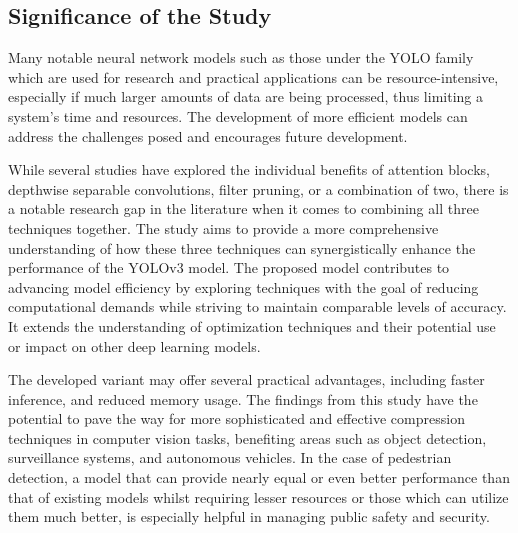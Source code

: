 \subsection{Significance of the Study}

Many notable neural network models such as those under the YOLO family which are used for research and practical applications can be resource-intensive, especially if much larger amounts of data are being processed, thus limiting a system's time and resources. The development of more efficient models can address the challenges posed and encourages future development. 

While several studies have explored the individual benefits of attention blocks, depthwise separable convolutions, filter pruning, or a combination of two, there is a notable research gap in the literature when it comes to combining all three techniques together. The study aims to provide a more comprehensive understanding of how these three techniques can synergistically enhance the performance of the YOLOv3 model. The proposed model contributes to advancing model efficiency by exploring techniques with the goal of reducing computational demands while striving to maintain comparable levels of accuracy. It extends the understanding of optimization techniques and their potential use or impact on other deep learning models.

The developed variant may offer several practical advantages, including faster inference, and reduced memory usage. The findings from this study have the potential to pave the way for more sophisticated and effective compression techniques in computer vision tasks, benefiting areas such as object detection, surveillance systems, and autonomous vehicles. In the case of pedestrian detection, a model that can provide nearly equal or even better performance than that of existing models whilst requiring lesser resources or those which can utilize them much better, is especially helpful in managing public safety and security.